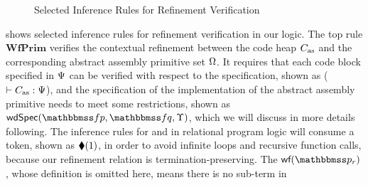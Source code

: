 \begin{figure*}[!t]
    \caption{Selected Inference Rules for Refinement Verification}
    \label{fig:Selected Inference Rules for Refinement Verification}
\end{figure*} 
\Fig{\ref{fig:Selected Inference Rules for Refinement Verification}} 
shows selected inference rules for refinement verification in our 
logic. The top rule $\textbf{WfPrim}$ verifies the contextual refinement 
between the code heap $C_{\text{as}}$ and the corresponding abstract assembly 
primitive set $\Omega$. It requires that each code block specified 
in $\Psi$ can be verified with respect to the specification, 
shown as ($\vdash {C_{\text{as}}} : {\Psi}$), and the specification 
of the implementation of the abstract assembly primitive needs 
to meet some restrictions, shown as $\wdSpec{\relspecpre}{\relspecpost}{\hprim}$, 
which we will discuss in more details following.
The inference rules for \jmp{} and \call{} in 
relational program logic will consume a token, 
shown as $\blacklozenge({1})$, in order to avoid 
infinite loops and recursive function calls, 
because our refinement relation is 
termination-preserving.
The $\wfFrm(\relastP_r)$, whose definition is omitted here,  
means there is no sub-term in 
